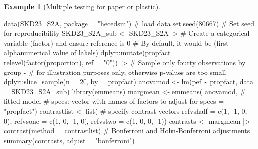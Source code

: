 \documentclass[
  11pt,
  letterpaper,
]{scrbook}
\newenvironment{Shaded}{\begin{snugshade}}{\end{snugshade}}
\newcommand{\AttributeTok}[1]{\textcolor[rgb]{0.40,0.45,0.13}{#1}}
\newcommand{\CommentTok}[1]{\textcolor[rgb]{0.37,0.37,0.37}{#1}}
\newcommand{\DecValTok}[1]{\textcolor[rgb]{0.68,0.00,0.00}{#1}}
\newcommand{\FunctionTok}[1]{\textcolor[rgb]{0.28,0.35,0.67}{#1}}
\newcommand{\NormalTok}[1]{\textcolor[rgb]{0.00,0.23,0.31}{#1}}
\newcommand{\OtherTok}[1]{\textcolor[rgb]{0.00,0.23,0.31}{#1}}
\newcommand{\SpecialCharTok}[1]{\textcolor[rgb]{0.37,0.37,0.37}{#1}}
\newcommand{\StringTok}[1]{\textcolor[rgb]{0.13,0.47,0.30}{#1}}
\theoremstyle{definition}
\newtheorem{example}{Example}[chapter]
\theoremstyle{remark}
\begin{document}
\begin{example}[Multiple testing for paper or
plastic]
\begin{Shaded}
\begin{Highlighting}[]
\FunctionTok{data}\NormalTok{(SKD23\_S2A, }\AttributeTok{package =} \StringTok{"hecedsm"}\NormalTok{) }\CommentTok{\# load data}
\FunctionTok{set.seed}\NormalTok{(}\DecValTok{80667}\NormalTok{) }\CommentTok{\# Set seed for reproducibility}
\NormalTok{SKD23\_S2A\_sub }\OtherTok{\textless{}{-}}\NormalTok{ SKD23\_S2A }\SpecialCharTok{|\textgreater{}}
  \CommentTok{\# Create a categorical variable (factor) and ensure reference is 0}
  \CommentTok{\# By default, it would be (first alphanumerical value of labels)}
\NormalTok{  dplyr}\SpecialCharTok{::}\FunctionTok{mutate}\NormalTok{(}\AttributeTok{propfact =} \FunctionTok{relevel}\NormalTok{(}\FunctionTok{factor}\NormalTok{(proportion), }\AttributeTok{ref =} \StringTok{"0"}\NormalTok{)) }\SpecialCharTok{|\textgreater{}}
  \CommentTok{\# Sample only fourty observations by group {-}}
  \CommentTok{\# for illustration purposes only, otherwise p{-}values are too small}
\NormalTok{  dplyr}\SpecialCharTok{::}\FunctionTok{slice\_sample}\NormalTok{(}\AttributeTok{n =} \DecValTok{20}\NormalTok{, }\AttributeTok{by =}\NormalTok{ propfact)}
\NormalTok{anovamod }\OtherTok{\textless{}{-}} \FunctionTok{lm}\NormalTok{(pef }\SpecialCharTok{\textasciitilde{}}\NormalTok{ propfact, }\AttributeTok{data =}\NormalTok{ SKD23\_S2A\_sub) }
\FunctionTok{library}\NormalTok{(emmeans)}
\NormalTok{margmean }\OtherTok{\textless{}{-}} \FunctionTok{emmeans}\NormalTok{(}
\NormalTok{  anovamod, }\CommentTok{\# fitted model}
  \CommentTok{\# \textquotesingle{}specs\textquotesingle{}: vector with names of factors to adjust for}
  \AttributeTok{specs =} \StringTok{"propfact"}\NormalTok{) }
\NormalTok{contrastlist }\OtherTok{\textless{}{-}} \FunctionTok{list}\NormalTok{( }\CommentTok{\# specify contrast vectors}
  \AttributeTok{refvshalf =} \FunctionTok{c}\NormalTok{(}\DecValTok{1}\NormalTok{, }\SpecialCharTok{{-}}\DecValTok{1}\NormalTok{, }\DecValTok{0}\NormalTok{, }\DecValTok{0}\NormalTok{),}
  \AttributeTok{refvsone =}  \FunctionTok{c}\NormalTok{(}\DecValTok{1}\NormalTok{, }\DecValTok{0}\NormalTok{, }\SpecialCharTok{{-}}\DecValTok{1}\NormalTok{, }\DecValTok{0}\NormalTok{),}
  \AttributeTok{refvstwo =}  \FunctionTok{c}\NormalTok{(}\DecValTok{1}\NormalTok{, }\DecValTok{0}\NormalTok{, }\DecValTok{0}\NormalTok{, }\SpecialCharTok{{-}}\DecValTok{1}\NormalTok{))}
\NormalTok{contrasts }\OtherTok{\textless{}{-}}\NormalTok{ margmean }\SpecialCharTok{|\textgreater{}} \FunctionTok{contrast}\NormalTok{(}\AttributeTok{method =}\NormalTok{ contrastlist)}
\CommentTok{\# Bonferroni and Holm{-}Bonferroni adjustments}
\FunctionTok{summary}\NormalTok{(contrasts, }\AttributeTok{adjust =} \StringTok{"bonferroni"}\NormalTok{)}
\end{Highlighting}
\end{Shaded}


\end{example}
\end{document}
